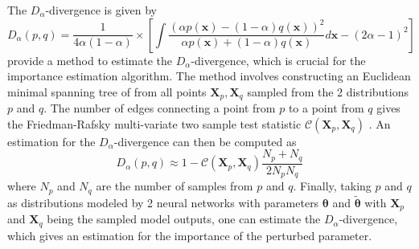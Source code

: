 The $D_\alpha$-divergence is given by 
\begin{equation}
    D_\alpha(p, q) = \frac{1}{4\alpha(1-\alpha)} \times \left[\int \frac{(\alpha p(\mathbf{x}) - (1-\alpha)q(\mathbf{x}))^2}{\alpha p(\mathbf{x}) + (1-\alpha)q(\mathbf{x})}d\mathbf{x} - (2\alpha-1)^2 \right]
\end{equation}
\textcite{fisher} provide a method to estimate the 
$D_\alpha$-divergence, which is crucial for the importance
estimation algorithm. The method involves constructing
an Euclidean minimal spanning tree of from all points 
$\mathbf{X}_p, \mathbf{X}_q$ sampled from the 
2 distributions $p$ and $q$. The number of edges 
connecting a point from $p$ to a point from $q$ gives
the Friedman-Rafsky multi-variate two sample test statistic
$\mathcal{C}(\mathbf{X}_p, \mathbf{X}_q)$
\parencite{fm}. An estimation for the $D_\alpha$-divergence
can then be computed as
\begin{equation}
    D_\alpha(p, q) \approx 1 - \mathcal{C}(\mathbf{X}_p, \mathbf{X}_q) \frac{N_p + N_q}{2N_pN_q}
\end{equation}
where $N_p$ and $N_q$ are the number of samples from $p$ 
and $q$. Finally, taking $p$ and $q$ as distributions modeled by 2 
neural networks with parameters $\bm{\theta}$ and
$\tilde{\bm{\theta}}$ with 
$\mathbf{X}_p$ and $\mathbf{X}_q$ being the sampled model 
outputs, one can estimate the $D_\alpha$-divergence,
which gives an estimation for 
the importance of the perturbed parameter.

